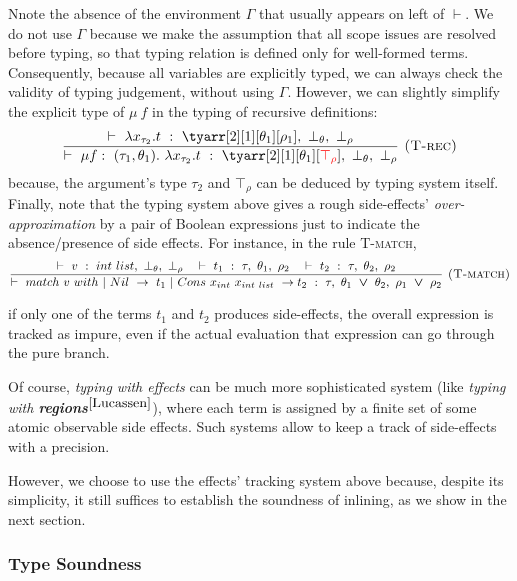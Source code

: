 \documentclass[a4paper,11pt,oneside]{article}
\theoremstyle{plain}
\newcommand{\bvee}{\boldsymbol{~\vee~}}
\newcommand{\typing}[4]{\vdash~#1~:~#2,~#3,~#4}
\newcommand{\bth}{\bot_\theta}
\newcommand{\brh}{\bot_\rho}
\newcommand{\trh}{\top_\rho}
\begin{document}
	Nnote the absence of the environment $\Gamma$ that usually appears on left of $\vdash$. We do not use $\Gamma$ because we make the assumption that all scope issues are resolved before typing, so that typing relation is defined only for well-formed terms. 
	 Consequently, because all variables are explicitly typed, we can always check the validity of typing judgement, without using $\Gamma$. 
	 However, we can slightly simplify the explicit type of $\mu~f$ in the typing of recursive definitions:
$$\dfrac 
	{\typing{\lambda x_{\tau_2}. t}{\tyarr[2][1][\theta_1][\rho_1]}{\bth}{\brh}}
	{\typing{\mu f:~(\tau_1, \theta_1) .~
		\lambda x_{\tau_2}. t}
		{\tyarr[2][1][\theta_1][\textcolor{red}{\trh}]}
			{\bth}{\brh}}
	{\textsc{  (T-rec)}}$$
because, the argument's type $\tau_2$ and $\top_{\rho}$ can be deduced by typing system itself. \\

	Finally, note that the typing system above gives a rough side-effects' \textit{over-approximation} by a pair of Boolean expressions just to indicate the absence/presence of side effects. 
	For instance, in the rule \textsc{T-match}, 
$$\dfrac
	{\typing{v}{int~list}{\bth}{\brh} \quad
	 \typing{t_1}{\tau}{\theta_1}{\rho_2}  \quad
	 \typing{t_2}{\tau}{\theta_2}{\rho_2}  }
	{\typing{match~v~with ~|~Nil~->~t_1~|~Cons~x_{int}~x_{int~list}~->t_2}{\tau}{\theta_1 \bvee \theta_2}
		{\rho_1 \bvee \rho_2}} 
{\textsc{  (T-match)}}$$
	
	if only one of the terms $t_1$ and $t_2$ produces side-effects, the overall expression is tracked as impure, even if the actual evaluation that expression can go through the pure branch.
	
	Of course, \textit{typing with effects} can be much more sophisticated system (like  \textit{typing with \textbf{regions}}$^{\cite{Lucassen}}$), where each term is assigned by a finite set of some atomic observable side effects. 
	Such systems allow to keep a track of side-effects with a precision.	
		
	However, we choose to use the effects' tracking system above because, despite its simplicity, it still suffices to establish the soundness of inlining, as we show in the next section. 
		
\subsubsection{Type Soundness}
\end{document}
